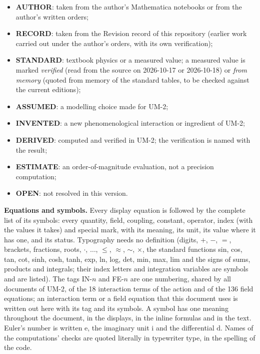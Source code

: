 \documentclass[
  10pt,
]{article}
\providecommand{\tightlist}{%
  \setlength{\itemsep}{0pt}\setlength{\parskip}{0pt}}
\begin{document}
\begin{itemize}
\tightlist
\item
  \textbf{AUTHOR}: taken from the author's Mathematica notebooks or from
  the author's written orders;
\item
  \textbf{RECORD}: taken from the Revision record of this repository
  (earlier work carried out under the author's orders, with its own
  verification);
\item
  \textbf{STANDARD}: textbook physics or a measured value; a measured
  value is marked \emph{verified} (read from the source on 2026-10-17 or
  2026-10-18) or \emph{from memory} (quoted from memory of the standard
  tables, to be checked against the current editions);
\item
  \textbf{ASSUMED}: a modelling choice made for UM-2;
\item
  \textbf{INVENTED}: a new phenomenological interaction or ingredient of
  UM-2;
\item
  \textbf{DERIVED}: computed and verified in UM-2; the verification is
  named with the result;
\item
  \textbf{ESTIMATE}: an order-of-magnitude evaluation, not a precision
  computation;
\item
  \textbf{OPEN}: not resolved in this version.
\end{itemize}

\textbf{Equations and symbols.} Every display equation is followed by
the complete list of its symbols: every quantity, field, coupling,
constant, operator, index (with the values it takes) and special mark,
with its meaning, its unit, its value where it has one, and its status.
Typography needs no definition (digits, \(+\), \(-\), \(=\), brackets,
fractions, roots, \(\cdot\), \(\dots\), \(\le\), \(\approx\), \(\sim\),
\(\times\), the standard functions sin, cos, tan, cot, sinh, cosh, tanh,
exp, ln, log, det, min, max, lim and the signs of sums, products and
integrals; their index letters and integration variables are symbols and
are listed). The tags IN-\(n\) and FE-\(n\) are one numbering, shared by
all documents of UM-2, of the 18 interaction terms of the action and of
the 136 field equations; an interaction term or a field equation that
this document uses is written out here with its tag and its symbols. A
symbol has one meaning throughout the document, in the displays, in the
inline formulas and in the text. Euler's number is written
\(\mathrm{e}\), the imaginary unit \(\mathrm{i}\) and the differential
\(\mathrm{d}\). Names of the computations' checks are quoted literally
in typewriter type, in the spelling of the code.
\end{document}
